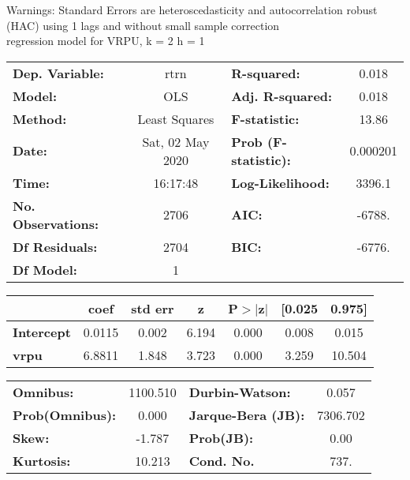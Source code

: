Warnings: \newline
 [1] Standard Errors are heteroscedasticity and autocorrelation robust (HAC) using 1 lags and without small sample correction\\ 

regression model for VRPU, k = 2 h = 1\begin{center}
\begin{tabular}{lclc}
\toprule
\textbf{Dep. Variable:}    &       rtrn       & \textbf{  R-squared:         } &     0.018   \\
\textbf{Model:}            &       OLS        & \textbf{  Adj. R-squared:    } &     0.018   \\
\textbf{Method:}           &  Least Squares   & \textbf{  F-statistic:       } &     13.86   \\
\textbf{Date:}             & Sat, 02 May 2020 & \textbf{  Prob (F-statistic):} &  0.000201   \\
\textbf{Time:}             &     16:17:48     & \textbf{  Log-Likelihood:    } &    3396.1   \\
\textbf{No. Observations:} &        2706      & \textbf{  AIC:               } &    -6788.   \\
\textbf{Df Residuals:}     &        2704      & \textbf{  BIC:               } &    -6776.   \\
\textbf{Df Model:}         &           1      & \textbf{                     } &             \\
\bottomrule
\end{tabular}
\begin{tabular}{lcccccc}
                   & \textbf{coef} & \textbf{std err} & \textbf{z} & \textbf{P$> |$z$|$} & \textbf{[0.025} & \textbf{0.975]}  \\
\midrule
\textbf{Intercept} &       0.0115  &        0.002     &     6.194  &         0.000        &        0.008    &        0.015     \\
\textbf{vrpu}      &       6.8811  &        1.848     &     3.723  &         0.000        &        3.259    &       10.504     \\
\bottomrule
\end{tabular}
\begin{tabular}{lclc}
\textbf{Omnibus:}       & 1100.510 & \textbf{  Durbin-Watson:     } &    0.057  \\
\textbf{Prob(Omnibus):} &   0.000  & \textbf{  Jarque-Bera (JB):  } & 7306.702  \\
\textbf{Skew:}          &  -1.787  & \textbf{  Prob(JB):          } &     0.00  \\
\textbf{Kurtosis:}      &  10.213  & \textbf{  Cond. No.          } &     737.  \\
\bottomrule
\end{tabular}
\end{center}

